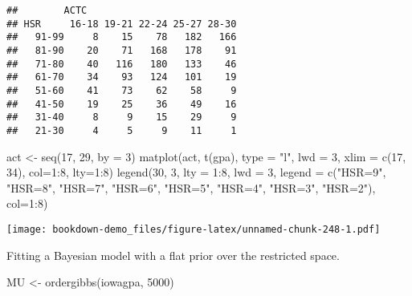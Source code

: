 \documentclass[
]{book}
\newenvironment{Shaded}{\begin{snugshade}}{\end{snugshade}}
\newcommand{\AttributeTok}[1]{\textcolor[rgb]{0.77,0.63,0.00}{#1}}
\newcommand{\DecValTok}[1]{\textcolor[rgb]{0.00,0.00,0.81}{#1}}
\newcommand{\FunctionTok}[1]{\textcolor[rgb]{0.00,0.00,0.00}{#1}}
\newcommand{\NormalTok}[1]{#1}
\newcommand{\OtherTok}[1]{\textcolor[rgb]{0.56,0.35,0.01}{#1}}
\newcommand{\SpecialCharTok}[1]{\textcolor[rgb]{0.00,0.00,0.00}{#1}}
\newcommand{\StringTok}[1]{\textcolor[rgb]{0.31,0.60,0.02}{#1}}
\begin{document}
\begin{verbatim}
##        ACTC
## HSR     16-18 19-21 22-24 25-27 28-30
##   91-99     8    15    78   182   166
##   81-90    20    71   168   178    91
##   71-80    40   116   180   133    46
##   61-70    34    93   124   101    19
##   51-60    41    73    62    58     9
##   41-50    19    25    36    49    16
##   31-40     8     9    15    29     9
##   21-30     4     5     9    11     1
\end{verbatim}

\begin{Shaded}
\begin{Highlighting}[]
\NormalTok{act }\OtherTok{\textless{}{-}} \FunctionTok{seq}\NormalTok{(}\DecValTok{17}\NormalTok{, }\DecValTok{29}\NormalTok{, }\AttributeTok{by =} \DecValTok{3}\NormalTok{)}
\FunctionTok{matplot}\NormalTok{(act, }\FunctionTok{t}\NormalTok{(gpa), }\AttributeTok{type =} \StringTok{"l"}\NormalTok{, }\AttributeTok{lwd =} \DecValTok{3}\NormalTok{, }
  \AttributeTok{xlim =} \FunctionTok{c}\NormalTok{(}\DecValTok{17}\NormalTok{, }\DecValTok{34}\NormalTok{), }\AttributeTok{col=}\DecValTok{1}\SpecialCharTok{:}\DecValTok{8}\NormalTok{, }\AttributeTok{lty=}\DecValTok{1}\SpecialCharTok{:}\DecValTok{8}\NormalTok{)}
\FunctionTok{legend}\NormalTok{(}\DecValTok{30}\NormalTok{, }\DecValTok{3}\NormalTok{, }\AttributeTok{lty =} \DecValTok{1}\SpecialCharTok{:}\DecValTok{8}\NormalTok{, }\AttributeTok{lwd =} \DecValTok{3}\NormalTok{, }
       \AttributeTok{legend =} \FunctionTok{c}\NormalTok{(}\StringTok{"HSR=9"}\NormalTok{, }\StringTok{"HSR=8"}\NormalTok{, }
     \StringTok{"HSR=7"}\NormalTok{, }\StringTok{"HSR=6"}\NormalTok{, }\StringTok{"HSR=5"}\NormalTok{, }\StringTok{"HSR=4"}\NormalTok{, }
     \StringTok{"HSR=3"}\NormalTok{, }\StringTok{"HSR=2"}\NormalTok{), }\AttributeTok{col=}\DecValTok{1}\SpecialCharTok{:}\DecValTok{8}\NormalTok{)}
\end{Highlighting}
\end{Shaded}

\texttt{[image: bookdown-demo\_files/figure-latex/unnamed-chunk-248-1.pdf]}

Fitting a Bayesian model with a flat prior over the restricted space.

\begin{Shaded}
\begin{Highlighting}[]
\NormalTok{MU }\OtherTok{\textless{}{-}} \FunctionTok{ordergibbs}\NormalTok{(iowagpa, }\DecValTok{5000}\NormalTok{)}
\end{Highlighting}
\end{Shaded}
\end{document}
